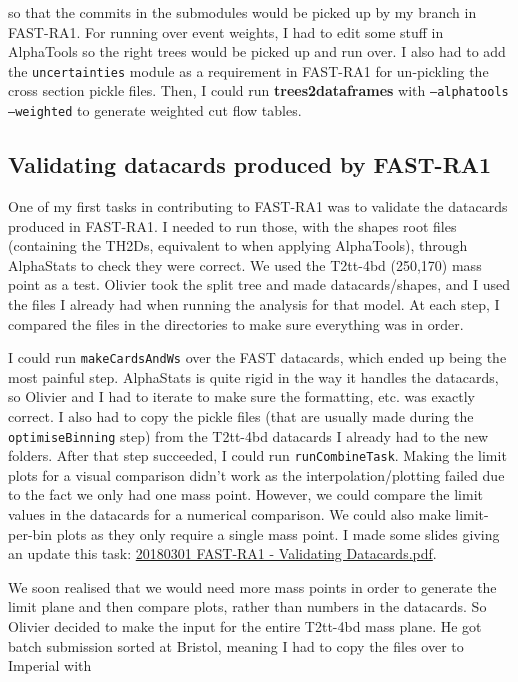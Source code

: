 so that the commits in the submodules would be picked up by my branch in FAST-RA1. For running over event weights, I had to edit some stuff in AlphaTools so the right trees would be picked up and run over. I also had to add the \texttt{uncertainties} module as a requirement in FAST-RA1 for un-pickling the cross section pickle files. Then, I could run \textbf{trees2dataframes} with \texttt{--alphatools --weighted} to generate weighted cut flow tables.


\subsection{Validating datacards produced by FAST-RA1}

One of my first tasks in contributing to FAST-RA1 was to validate the datacards produced in FAST-RA1. I needed to run those, with the shapes root files (containing the TH2Ds, equivalent to when applying AlphaTools), through AlphaStats to check they were correct. We used the T2tt-4bd (250,170) mass point as a test. Olivier took the split tree and made datacards/shapes, and I used the files I already had when running the analysis for that model. At each step, I compared the files in the directories to make sure everything was in order.

I could run \texttt{makeCardsAndWs} over the FAST datacards, which ended up being the most painful step. AlphaStats is quite rigid in the way it handles the datacards, so Olivier and I had to iterate to make sure the formatting, etc. was exactly correct. I also had to copy the pickle files (that are usually made during the \texttt{optimiseBinning} step) from the T2tt-4bd datacards I already had to the new folders. After that step succeeded, I could run \texttt{runCombineTask}. Making the limit plots for a visual comparison didn't work as the interpolation/plotting failed due to the fact we only had one mass point. However, we could compare the limit values in the datacards for a numerical comparison. We could also make limit-per-bin plots as they only require a single mass point. I made some slides giving an update this task: \href{run:./sec36/20180301 FAST-RA1 - Validating Datacards.pdf}{20180301 FAST-RA1 - Validating Datacards.pdf}.

We soon realised that we would need more mass points in order to generate the limit plane and then compare plots, rather than numbers in the datacards. So Olivier decided to make the input for the entire T2tt-4bd mass plane. He got batch submission sorted at Bristol, meaning I had to copy the files over to Imperial with

